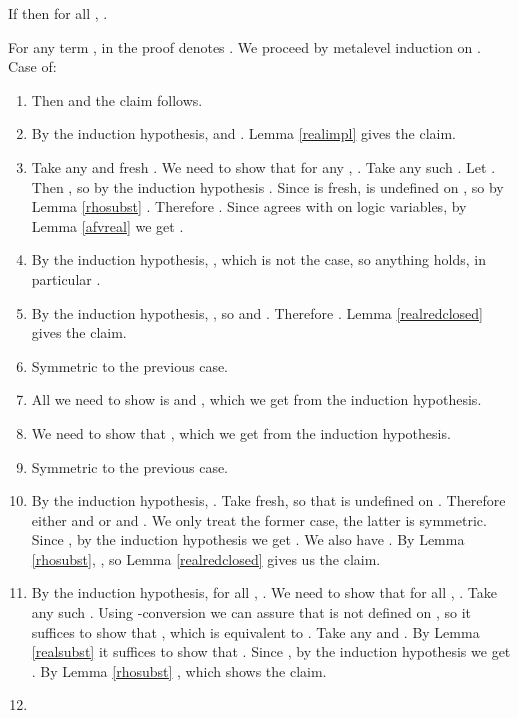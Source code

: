 \documentclass{LMCS}
\begin{document}
\begin{thm}[Normalization]\label{norm}
If  then for all , .
\end{thm}
\proof For any  term ,  in the proof denotes .
We proceed by metalevel induction on . Case  of:
\begin{enumerate}[]
\item 

Then  and the claim follows.
\item 

By the induction hypothesis,  and . Lemma
\ref{realimpl} gives the claim.
\item

Take any  and fresh . We need to show that for any , . Take any such . Let
. Then , so by the
induction hypothesis . Since  is
fresh,  is undefined on , so by Lemma \ref{rhosubst} . Therefore . Since  agrees with  on logic variables, by Lemma \ref{afvreal} we get .
\item 

By the induction hypothesis, , which is not the case, so
anything holds, in particular .
\item

By the induction hypothesis, , so  and
. Therefore .
Lemma \ref{realredclosed} gives the claim. 
\item 

Symmetric to the previous case. 
\item 

All we need to show is  and , which we
get from the induction hypothesis.
\item

We need to show that , which we get from the induction hypothesis.
\item

Symmetric to the previous case.
\item 

By the induction hypothesis, . Take  fresh, so
that  is undefined on . Therefore either  and  or  and
. We only treat the former case, the latter is symmetric.
Since , by the
induction hypothesis we get . We also
have . By Lemma
\ref{rhosubst}, , so Lemma \ref{realredclosed} gives us the claim.
\item

By the induction hypothesis, for all , . We need to show that for all , . Take any such .  Using -conversion we can assure that  is not defined on
, so it suffices to show that ,
which is equivalent to . Take any  and . By Lemma \ref{realsubst} it suffices to
show that . 
Since , by the induction hypothesis we get 
. By Lemma \ref{rhosubst}
, which shows the claim. 
\item


\end{enumerate}
\end{document}
